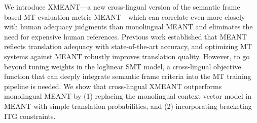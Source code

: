 We introduce XMEANT---a new cross-lingual version of the semantic frame based MT evaluation metric MEANT---which can correlate even more closely with human adequacy judgments than monolingual MEANT and eliminates the need for expensive human references. Previous work established that MEANT reflects translation adequacy with state-of-the-art accuracy, and optimizing MT systems against MEANT robustly improves translation quality. However, to go beyond tuning weights in the loglinear SMT model, a cross-lingual objective function that can deeply integrate semantic frame criteria into the MT training pipeline is needed. We show that cross-lingual XMEANT outperforms monolingual MEANT by (1) replacing the monolingual context vector model in MEANT with simple translation probabilities, and (2) incorporating bracketing ITG constraints.

